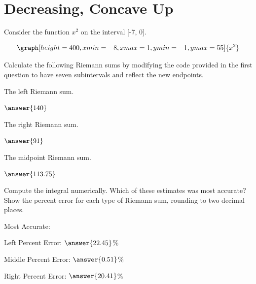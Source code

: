 \documentclass{ximera}
\begin{document}
\section{Decreasing, Concave Up}
\begin{question}
Consider the function $x^2$ on the interval [-7, 0].

\[
\graph[height=400,xmin=-8,xmax=1,ymin=-1,ymax=55]{x^2}
\]

Calculate the following Riemann sums by modifying the code provided in the first question to have seven subintervals and reflect the new endpoints.

The left Riemann sum.

\begin{onlineOnly}
\begin{sageCell}

\end{sageCell}
\end{onlineOnly}

$\answer{140}$

The right Riemann sum.

\begin{onlineOnly}
\begin{sageCell}

\end{sageCell}
\end{onlineOnly}

$\answer{91}$

The midpoint Riemann sum.

\begin{onlineOnly}
\begin{sageCell}

\end{sageCell}
\end{onlineOnly}

$\answer{113.75}$

Compute the integral numerically. Which of these estimates was most accurate? Show the percent error for each type of Riemann sum, rounding to two decimal places.

\begin{onlineOnly}
\begin{sageCell}

\end{sageCell}
\end{onlineOnly}

Most Accurate:
\begin{multipleChoice}
\end{multipleChoice}
Left Percent Error: $\answer{22.45}$\%

Middle Percent Error: $\answer{0.51}$\%

Right Percent Error: $\answer{20.41}$\%
\end{question}
\end{document}
